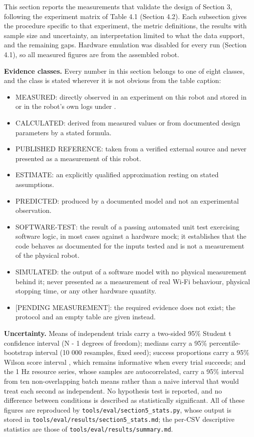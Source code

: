 This section reports the measurements that validate the design of Section 3, following the experiment matrix of Table 4.1 (Section 4.2). Each subsection gives the procedure specific to that experiment, the metric definitions, the results with sample size and uncertainty, an interpretation limited to what the data support, and the remaining gaps. Hardware emulation was disabled for every run (Section 4.1), so all measured figures are from the assembled robot.

\textbf{Evidence classes.} Every number in this section belongs to one of eight classes, and the class is stated wherever it is not obvious from the table caption:

\begin{itemize}
\item MEASURED: directly observed in an experiment on this robot and stored in \texttt{} or in the robot's own logs under \texttt{}.
\item CALCULATED: derived from measured values or from documented design parameters by a stated formula.
\item PUBLISHED REFERENCE: taken from a verified external source and never presented as a measurement of this robot.
\item ESTIMATE: an explicitly qualified approximation resting on stated assumptions.
\item PREDICTED: produced by a documented model and not an experimental observation.
\item SOFTWARE-TEST: the result of a passing automated unit test exercising software logic, in most cases against a hardware mock; it establishes that the code behaves as documented for the inputs tested and is not a measurement of the physical robot.
\item SIMULATED: the output of a software model with no physical measurement behind it; never presented as a measurement of real Wi-Fi behaviour, physical stopping time, or any other hardware quantity.
\item {[}PENDING MEASUREMENT{]}: the required evidence does not exist; the protocol and an empty table are given instead.
\end{itemize}

\textbf{Uncertainty.} Means of independent trials carry a two-sided 95\% Student t confidence interval (N - 1 degrees of freedom); medians carry a 95\% percentile-bootstrap interval (10 000 resamples, fixed seed); success proportions carry a 95\% Wilson score interval \cite{wilson1927}, which remains informative when every trial succeeds; and the 1 Hz resource series, whose samples are autocorrelated, carry a 95\% interval from ten non-overlapping batch means rather than a naive interval that would treat each second as independent. No hypothesis test is reported, and no difference between conditions is described as statistically significant. All of these figures are reproduced by \texttt{tools/eval/section5\_stats.py}, whose output is stored in \texttt{tools/eval/results/section5\_stats.md}; the per-CSV descriptive statistics are those of \texttt{tools/eval/results/summary.md}.

